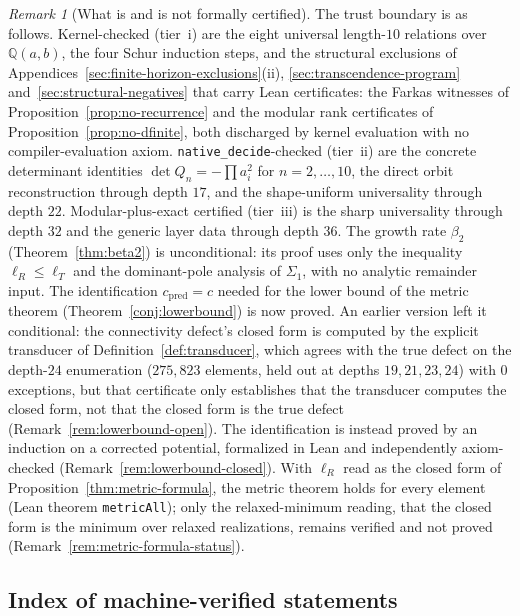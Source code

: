 \documentclass[11pt]{article}
\theoremstyle{plain}
\theoremstyle{definition}
\theoremstyle{remark}
\newtheorem{remark}[theorem]{Remark}
\begin{document}
\begin{remark}[What is and is not formally certified]
\label{rem:reproduce-summary}
The trust boundary is as follows. Kernel-checked (tier~i) are the eight
universal length-$10$ relations over $\mathbb{Q}(a,b)$, the four
Schur induction steps, and the structural exclusions of
Appendices~\ref{sec:finite-horizon-exclusions}(ii),
\ref{sec:transcendence-program} and~\ref{sec:structural-negatives} that carry
Lean certificates: the Farkas witnesses of
Proposition~\ref{prop:no-recurrence} and the modular rank certificates of
Proposition~\ref{prop:no-dfinite}, both discharged by kernel evaluation with
no compiler-evaluation axiom. \texttt{native\_decide}-checked (tier~ii) are the
concrete determinant identities $\det Q_n=-\prod a_i^2$ for
$n=2,\dots,10$, the direct orbit reconstruction through depth $17$, and
the shape-uniform universality through depth $22$. Modular-plus-exact
certified (tier~iii) is the sharp universality through depth $32$ and the
generic layer data through depth $36$. The growth rate $\beta_2$ (Theorem~\ref{thm:beta2}) is unconditional: its proof uses only the inequality $\ell_R\le\ell_T$ and the dominant-pole analysis of $\Sigma_1$, with no analytic remainder input. The identification $c_{\mathrm{pred}}=c$ needed for the lower bound of the metric theorem (Theorem~\ref{conj:lowerbound}) is now proved. An earlier version left it conditional: the connectivity defect's closed form is computed by the explicit transducer of Definition~\ref{def:transducer}, which agrees with the true defect on the depth-$24$ enumeration ($275{,}823$ elements, held out at depths $19,21,23,24$) with $0$ exceptions, but that certificate only establishes that the transducer computes the closed form, not that the closed form is the true defect (Remark~\ref{rem:lowerbound-open}). The identification is instead proved by an induction on a corrected potential, formalized in Lean and independently axiom-checked (Remark~\ref{rem:lowerbound-closed}). With $\ell_R$ read as the closed form of Proposition~\ref{thm:metric-formula}, the metric theorem holds for every element (Lean theorem \texttt{metricAll}); only the relaxed-minimum reading, that the closed form is the minimum over relaxed realizations, remains verified and not proved (Remark~\ref{rem:metric-formula-status}).
\end{remark}



\subsection{Index of machine-verified statements}
\label{ssec:lean-index}
\end{document}
